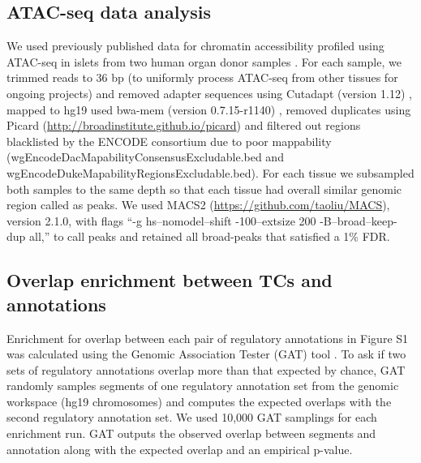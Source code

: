 \subsection{ATAC-seq data analysis}
We used previously published data for chromatin accessibility profiled using ATAC-seq in islets from two human organ donor samples \cite{varshneyGeneticRegulatorySignatures2017}. For each sample, we trimmed reads to 36 bp (to uniformly process ATAC-seq from other tissues for ongoing projects) and removed adapter sequences using Cutadapt (version 1.12) \cite{martinCutadaptRemovesAdapter2011}, mapped to hg19 used bwa-mem (version 0.7.15-r1140) \cite{liAligningSequenceReads2013}, removed duplicates using Picard (\url{http://broadinstitute.github.io/picard}) and filtered out regions blacklisted by the ENCODE consortium due to poor mappability (wgEncodeDacMapabilityConsensusExcludable.bed and wgEncodeDukeMapabilityRegionsExcludable.bed). For each tissue we subsampled both samples to the same depth so that each tissue had overall similar genomic region called as peaks. We used MACS2 (\url{https://github.com/taoliu/MACS}), version 2.1.0, with flags “-g hs–nomodel–shift -100–extsize 200 -B–broad–keep-dup all,” to call peaks and retained all broad-peaks that satisfied a 1\% FDR.
        
\subsection{Overlap enrichment between TCs and annotations}
Enrichment for overlap between each pair of regulatory annotations in Figure S1 was calculated using the Genomic Association Tester (GAT) tool \cite{hegerGATSimulationFramework2013}. To ask if two sets of regulatory annotations overlap more than that expected by chance, GAT randomly samples segments of one regulatory annotation set from the genomic workspace (hg19 chromosomes) and computes the expected overlaps with the second regulatory annotation set. We used 10,000 GAT samplings for each enrichment run. GAT outputs the observed overlap between segments and annotation along with the expected overlap and an empirical p-value.


